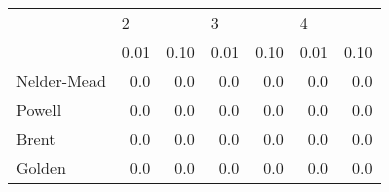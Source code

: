 \begin{tabular}{lrrrrrr}
\toprule
{} & \multicolumn{2}{l}{2} & \multicolumn{2}{l}{3} & \multicolumn{2}{l}{4} \\
{} & 0.01 & 0.10 & 0.01 & 0.10 & 0.01 & 0.10 \\
\midrule
Nelder-Mead &  0.0 &  0.0 &  0.0 &  0.0 &  0.0 &  0.0 \\
Powell      &  0.0 &  0.0 &  0.0 &  0.0 &  0.0 &  0.0 \\
Brent       &  0.0 &  0.0 &  0.0 &  0.0 &  0.0 &  0.0 \\
Golden      &  0.0 &  0.0 &  0.0 &  0.0 &  0.0 &  0.0 \\
\bottomrule
\end{tabular}
